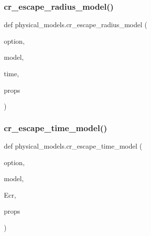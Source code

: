 \subsubsection{\texorpdfstring{cr\+\_\+escape\+\_\+radius\+\_\+model()}{cr\_escape\_radius\_model()}}
{\footnotesize\ttfamily def physical\+\_\+models.\+cr\+\_\+escape\+\_\+radius\+\_\+model (\begin{DoxyParamCaption}\item[{}]{option,  }\item[{}]{model,  }\item[{}]{time,  }\item[{}]{props }\end{DoxyParamCaption})}

\mbox{\label{namespacephysical__models_a9704b22609ef5b0831d6fe42d69b3018}} 
\subsubsection{\texorpdfstring{cr\+\_\+escape\+\_\+time\+\_\+model()}{cr\_escape\_time\_model()}}
{\footnotesize\ttfamily def physical\+\_\+models.\+cr\+\_\+escape\+\_\+time\+\_\+model (\begin{DoxyParamCaption}\item[{}]{option,  }\item[{}]{model,  }\item[{}]{Ecr,  }\item[{}]{props }\end{DoxyParamCaption})}

